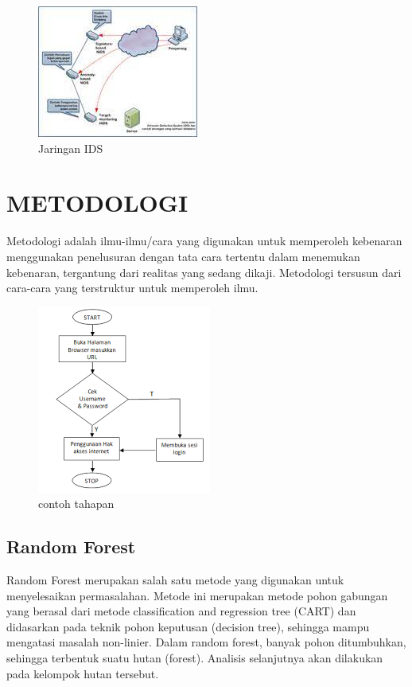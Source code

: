 \documentclass[conference]{IEEEtran}
\begin{document}
\begin{figure}
\centering
\includegraphics[width=.4\textwidth]{Gambar/gambar6.jpg}
\caption{Jaringan IDS}
\end{figure}

\section{METODOLOGI}

Metodologi adalah ilmu-ilmu/cara yang digunakan untuk memperoleh kebenaran menggunakan penelusuran dengan tata cara tertentu dalam menemukan kebenaran, tergantung dari realitas yang sedang dikaji. Metodologi tersusun dari cara-cara yang terstruktur untuk memperoleh ilmu.

\begin{figure}
\centering
\includegraphics[width=.4\textwidth]{Gambar/gambar5.png}
\caption{contoh tahapan}
\end{figure}

\subsection{Random Forest}
Random Forest merupakan salah satu metode yang digunakan untuk menyelesaikan permasalahan. Metode ini merupakan metode pohon gabungan yang berasal dari metode
classification and regression tree (CART) dan didasarkan pada
teknik pohon keputusan (decision tree), sehingga mampu mengatasi masalah non-linier. Dalam random forest, banyak pohon
ditumbuhkan, sehingga terbentuk suatu hutan (forest). Analisis
selanjutnya akan dilakukan pada kelompok hutan tersebut.
\end{document}
